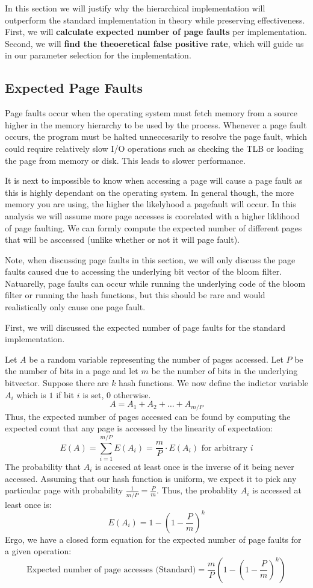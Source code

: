 In this section we will justify why the hierarchical implementation will outperform the standard implementation in theory while preserving effectiveness.
First, we will \textbf{calculate expected number of page faults} per implementation.
Second, we will \textbf{find the theoeretical false positive rate}, which will guide us in our parameter selection for the implementation.

\subsection{Expected Page Faults}
Page faults occur when the operating system must fetch memory from a source higher in the memory hierarchy to be used by the process.
Whenever a page fault occurs, the program must be halted unneccesarily to resolve the page fault, which could require relatively slow I/O operations such as checking the TLB or loading the page from memory or disk.
This leads to slower performance.

It is next to impossible to know when accessing a page will cause a page fault as this is highly dependant on the operating system.
In general though, the more memory you are using, the higher the likelyhood a pagefault will occur.
In this analysis we will assume more page accesses is coorelated with a higher liklihood of page faulting.
We can formly compute the expected number of different pages that will be asccessed (unlike whether or not it will page fault).

Note, when discussing page faults in this section, we will only discuss the page faults caused due to accessing the underlying bit vector of the bloom filter.
Natuarelly, page faults can occur while running the underlying code of the bloom filter or running the hash functions, but this should be rare and would realistically only cause one page fault.

First, we will discussed the expected number of page faults for the standard implementation.

Let $A$ be a random variable representing the number of pages accessed. 
Let $P$ be the number of bits in a page and let $m$ be the number of bits in the underlying bitvector.
Suppose there are $k$ hash functions.
We now define the indictor variable $A_i$ which is $1$ if bit $i$ is set, $0$ otherwise.
$$A = A_1 + A_2 + \ldots + A_{m/P}$$
Thus, the expected number of pages accessed can be found by computing the expected count that any page is accessed by the linearity of expectation:
$$E(A) = \sum_{i=1}^{m/P} E(A_i) = \frac{m}{P} \cdot E(A_i) \text{ for arbitrary $i$}$$
The probability that $A_i$ is accesed at least once is the inverse of it being never accessed.
Assuming that our hash function is uniform, we expect it to pick any particular page with probability $\frac{1}{m/P} = \frac{P}{m}$.
Thus, the probablity $A_i$ is accessed at least once is:
$$E(A_i)  = 1 - (1 - \frac{P}{m})^k$$
Ergo, we have a closed form equation for the expected number of page faults for a given operation:
$$\text{Expected number of page accesses (Standard)} = \frac{m}{P} (1 - (1 - \frac{P}{m})^k)$$

